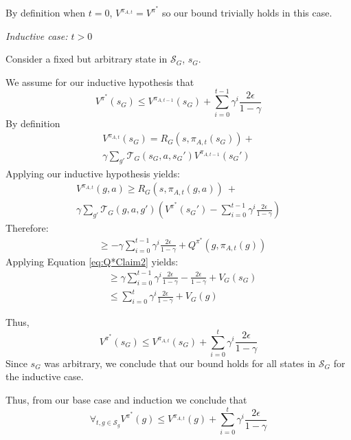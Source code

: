 By definition when $t=0$, $V^{\pi_{A,t}} = V^{\pi^*}$ so our bound trivially holds in this case.

\textit{Inductive case: $t > 0$}

Consider a fixed but arbitrary state in $\mathcal{S}_G$, $s_G$.

We assume for our inductive hypothesis that
\begin{equation}
V^{\pi^*}(s_G) \leq V^{\pi_{A,t-1}}(s_G)  + \sum_{i=0}^{t-1}\gamma^i \frac{2\epsilon}{1-\gamma}
\end{equation}
By definition 
\begin{multline*}
V^{\pi_{A,t}}(s_G) = R_G(s, \pi_{A,t}(s_G)) + \\ \gamma \sum_{g'}\mathcal{T}_G(s_G, a, {s_G}')V^{\pi_{A,t-1}}({s_G}')
\end{multline*}
Applying our inductive hypothesis yields:
\begin{multline*}
V^{\pi_{A,t}}(g, a) \geq R_G(s, \pi_{A,t}(g, a))\ + \\ \gamma \sum_{g'}\mathcal{T}_G(g, a, g')\left(V^{\pi^*}({s_G}') - \sum_{i=0}^{t-1}\gamma^i \frac{2\epsilon}{1-\gamma} \right)
\end{multline*}
Therefore:
\begin{align*}
&\geq -\gamma\sum_{i=0}^{t-1}\gamma^i \frac{2\epsilon}{1-\gamma} + Q^{\pi^*}(g, \pi_{A,t} (g))
\end{align*}
Applying Equation \ref{eq:Q*Claim2} yields:
\begin{align*}
&\geq \gamma\sum_{i=0}^{t-1}\gamma^i \frac{2\epsilon}{1-\gamma} - \frac{2\epsilon}{1-\gamma} + V_{G}(s_G)\\
&\leq \sum_{i=0}^{t}\gamma^i \frac{2\epsilon}{1-\gamma} + V_G(g)
\end{align*}

Thus,
\begin{equation*}
V^{\pi^*}(s_G) \leq V^{\pi_{A,t}}(s_G)  + \sum_{i=0}^{t}\gamma^i \frac{2\epsilon}{1-\gamma}
\end{equation*}
Since $s_G$ was arbitrary, we conclude that our bound holds for all states in $\mathcal{S}_G$ for the inductive case.

Thus, from our base case and induction we conclude that
\begin{equation}
\forall_{t, g \in \mathcal{S}_g} V^{\pi^*}(g) \leq  V^{\pi_{A,t}}(g) + \sum_{i=0}^{t}\gamma^i \frac{2\epsilon}{1-\gamma}
\end{equation}

